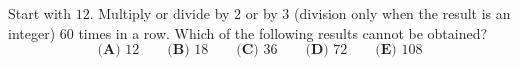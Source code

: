 Start with $12$. Multiply or divide by $2$ or by $3$ (division only when the result is an integer) $60$ times in a row. Which of the following results cannot be obtained?
\[
\textbf{(A) }12\qquad\textbf{(B) }18\qquad\textbf{(C) }36\qquad\textbf{(D) }72\qquad\textbf{(E) }108
\]
